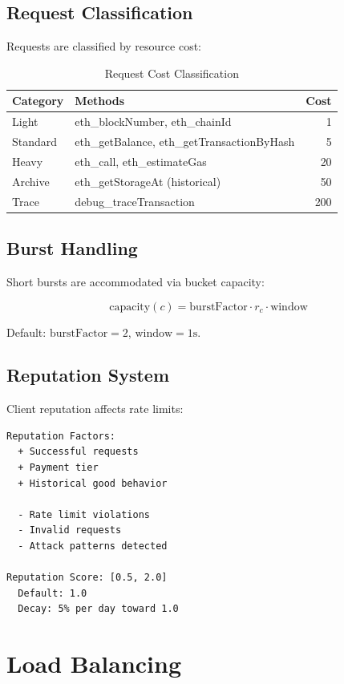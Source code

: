 \documentclass[11pt,a4paper]{article}
\begin{document}
\subsection{Request Classification}

Requests are classified by resource cost:

\begin{table}[htbp]
\centering
\caption{Request Cost Classification}
\begin{tabular}{llr}
\toprule
\textbf{Category} & \textbf{Methods} & \textbf{Cost} \\
\midrule
Light & eth\_blockNumber, eth\_chainId & 1 \\
Standard & eth\_getBalance, eth\_getTransactionByHash & 5 \\
Heavy & eth\_call, eth\_estimateGas & 20 \\
Archive & eth\_getStorageAt (historical) & 50 \\
Trace & debug\_traceTransaction & 200 \\
\bottomrule
\end{tabular}
\label{tab:costs}
\end{table}

\subsection{Burst Handling}

Short bursts are accommodated via bucket capacity:

\[
\text{capacity}(c) = \text{burstFactor} \cdot r_c \cdot \text{window}
\]

Default: $\text{burstFactor} = 2$, $\text{window} = 1\text{s}$.

\subsection{Reputation System}

Client reputation affects rate limits:

\begin{lstlisting}
Reputation Factors:
  + Successful requests
  + Payment tier
  + Historical good behavior

  - Rate limit violations
  - Invalid requests
  - Attack patterns detected

Reputation Score: [0.5, 2.0]
  Default: 1.0
  Decay: 5% per day toward 1.0
\end{lstlisting}

\section{Load Balancing}
\end{document}
